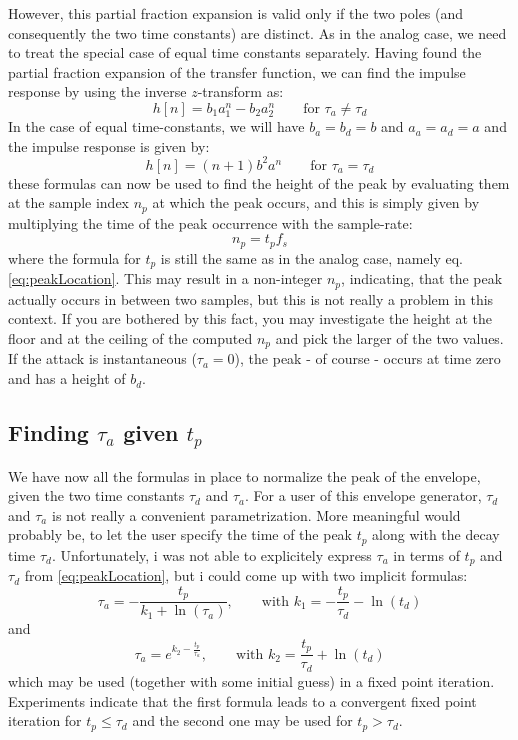 However, this partial fraction expansion is valid only if the two poles (and consequently the two time constants) are distinct. As in the analog case, we need to treat the special case of equal time constants separately. Having found the partial fraction expansion of the transfer function, we can find the impulse response by using the inverse $z$-transform as:
\begin{equation}
 h[n] = b_1 a_1^n - b_2 a_2^n \qquad \text{for } \tau_a \neq \tau_d
\end{equation}
In the case of equal time-constants, we will have $b_a = b_d = b$ and $a_a = a_d = a$ and the impulse response is given by:
\begin{equation}
 h[n] = (n+1) b^2 a^n \qquad \text{for } \tau_a = \tau_d
\end{equation}
these formulas can now be used to find the height of the peak by evaluating them at the sample index $n_p$ at which the peak occurs, and this is simply given by multiplying the time of the peak occurrence with the sample-rate:
\begin{equation}
 n_p = t_p f_s
\end{equation}
where the formula for $t_p$ is still the same as in the analog case, namely eq. \ref{eq:peakLocation}. This may result in a non-integer $n_p$, indicating, that the peak actually occurs in between two samples, but this is not really a problem in this context. If you are bothered by this fact, you may investigate the height at the floor and at the ceiling of the computed $n_p$ and pick the larger of the two values. If the attack is instantaneous ($\tau_a = 0$), the peak - of course - occurs at time zero and has a height of $b_d$.

\subsection{Finding $\tau_a$ given $t_p$}
We have now all the formulas in place to normalize the peak of the envelope, given the two time constants $\tau_d$ and $\tau_a$. For a user of this envelope generator, $\tau_d$ and $\tau_a$ is not really a convenient parametrization. More meaningful would probably be, to let the user specify the time of the peak $t_p$ along with the decay time $\tau_d$.  
Unfortunately, i was not able to explicitely express  $\tau_a$ in terms of $t_p$ and $\tau_d$ from \ref{eq:peakLocation}, but i could come up with two implicit formulas:
\begin{equation}
 \tau_a = - \frac{t_p}{k_1 + \ln(\tau_a)}, \qquad \text{with } k_1 = -\frac{t_p}{\tau_d} - \ln(t_d)
\end{equation}
and
\begin{equation}
 \tau_a = e^{k_2 - \frac{t_p}{\tau_a}}, \qquad \text{with } k_2 = \frac{t_p}{\tau_d} + \ln(t_d) 
\end{equation}
which may be used (together with some initial guess) in a fixed point iteration. Experiments indicate that the first formula leads to a convergent fixed point iteration for $t_p \leq \tau_d$ and the second one may be used for $t_p > \tau_d$.

